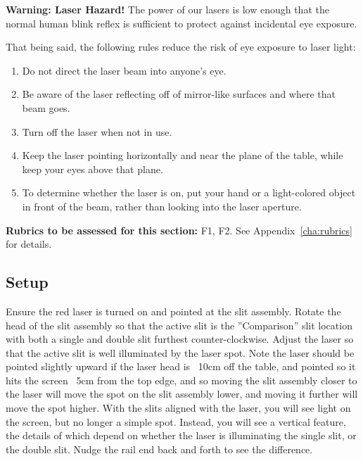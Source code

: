 \begin{framed}
	\textbf{Warning: Laser Hazard!} The power of our lasers is low enough that the normal human blink reflex is sufficient to protect against incidental eye exposure.
	
	That being said, the following rules reduce the risk of eye exposure to laser light:
	\begin{enumerate}
		\item Do not direct the laser beam into anyone's eye.
		\item Be aware of the laser reflecting off of mirror-like surfaces and where that beam goes.
		\item Turn off the laser when not in use.
		\item Keep the laser pointing horizontally and near the plane of the table, while keep your eyes above that plane.
		\item To determine whether the laser is on, put your hand or a light-colored object in front of the beam, rather than looking into the laser aperture.
	\end{enumerate}
\end{framed}

\textbf{Rubrics to be assessed for this section:} F1, F2. See Appendix~\ref{cha:rubrics} for details.

\subsection{Setup}
Ensure the red laser is turned on and pointed at the slit assembly. Rotate the head of the slit assembly so that the active slit is the ''Comparison'' slit location with both a single
and double slit furthest counter-clockwise. Adjust the laser so that the active slit
is well illuminated by the laser spot. Note the laser should be pointed slightly upward if the laser head is ~10cm off the
table, and pointed so it hits the screen ~5cm from the top edge, and so moving the slit assembly closer to the laser will
move the spot on the slit assembly lower, and moving it further will move the spot higher. With the slits aligned with the
laser, you will see light on the screen, but no longer a simple spot. Instead, you will see a vertical feature, the details of
which depend on whether the laser is illuminating the single slit, or the double slit. Nudge the rail end back and forth to
see the difference.

